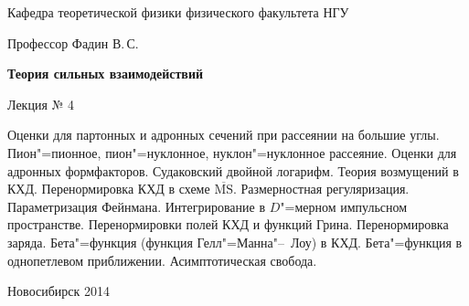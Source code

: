 \documentclass[12pt,pagesize,paper=192mm:108mm]{scrbook}
\begin{document}
\begin{titlepage}
\begin{center}
    Кафедра теоретической физики физического факультета НГУ
    \medskip

    \Large
    Профессор Фадин В.\,С.

    \huge
    \textbf{Теория сильных взаимодействий}
    \smallskip
    
    \Large
    Лекция № 4
    \vfill
    
    \normalsize
    \begin{minipage}{0.9\linewidth}
      Оценки для партонных и адронных сечений при рассеянии на большие
      углы. Пион"=пионное, пион"=нуклонное, нуклон"=нуклонное
      рассеяние. Оценки для адронных формфакторов. Судаковский двойной
      логарифм. Теория возмущений в КХД. Перенормировка КХД в схеме
      $\overline{\text{MS}}$. Размерностная регуляризация. Параметризация
      Фейнмана. Интегрирование в $D$"=мерном импульсном
      пространстве. Перенормировки полей КХД и функций
      Грина. Перенормировка заряда. Бета"=функция (функция
      Гелл"=Манна"--~Лоу) в КХД. Бета"=функция в однопетлевом
      приближении. Асимптотическая свобода.
    \end{minipage}
    \vfill
    
    \normalsize \ccbysa\hspace{0.5em}  Новосибирск 2014   
  \end{center}
\end{titlepage}
\end{document}
